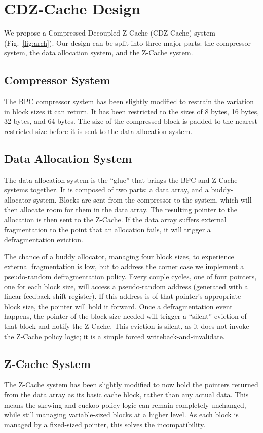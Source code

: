 \documentclass[conference]{IEEEtran}
\begin{document}
\section{CDZ-Cache Design}
We propose a Compressed Decoupled Z-Cache (CDZ-Cache) system
(Fig.~\ref{fig:arch}). Our design can be split into three major parts: the
compressor system, the data allocation system, and the Z-Cache system.

\subsection{Compressor System}
The BPC compressor system has been slightly modified to restrain the variation
in block sizes it can return. It has been restricted to the sizes of 8 bytes,
16 bytes, 32 bytes, and 64 bytes. The size of the compressed block is padded to
the nearest restricted size before it is sent to the data allocation system.

\subsection{Data Allocation System}
The data allocation system is the ``glue'' that brings the BPC and Z-Cache
systems together. It is composed of two parts: a data array, and a
buddy-allocator system. Blocks are sent from the compressor to the system,
which will then allocate room for them in the data array. The resulting pointer
to the allocation is then sent to the Z-Cache. If the data array suffers
external fragmentation to the point that an allocation fails, it will trigger a
defragmentation eviction.

The chance of a buddy allocator, managing four block sizes, to experience
external fragmentation is low, but to address the corner case we implement a
pseudo-random defragmentation policy. Every couple cycles, one of four
pointers, one for each block size, will access a pseudo-random address
(generated with a linear-feedback shift register). If this address is of that
pointer's appropriate block size, the pointer will hold it forward. Once a
defragmentation event happens, the pointer of the block size needed will
trigger a ``silent'' eviction of that block and notify the Z-Cache. This
eviction is silent, as it does not invoke the Z-Cache policy logic; it is a
simple forced writeback-and-invalidate.

\subsection{Z-Cache System}
The Z-Cache system has been slightly modified to now hold the pointers returned
from the data array as its basic cache block, rather than any actual data. This
means the skewing and cuckoo policy logic can remain completely unchanged,
while still managing variable-sized blocks at a higher level. As each block is
managed by a fixed-sized pointer, this solves the incompatibility.
\end{document}
